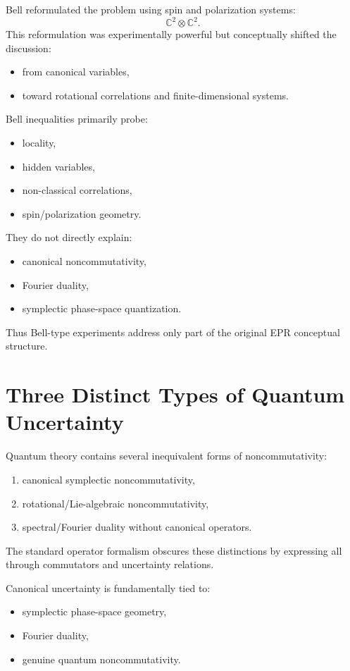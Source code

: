Bell reformulated the problem using spin and polarization systems:
\[
\mathbb C^2\otimes\mathbb C^2.
\]
This reformulation was experimentally powerful but conceptually 
shifted the discussion:
\begin{itemize}
\item from canonical variables,
\item toward rotational correlations and finite-dimensional systems.
\end{itemize}
Bell inequalities primarily probe:
\begin{itemize}
\item locality,
\item hidden variables,
\item non-classical correlations,
\item spin/polarization geometry.
\end{itemize}
They do not directly explain:
\begin{itemize}
\item canonical noncommutativity,
\item Fourier duality,
\item symplectic phase-space quantization.
\end{itemize}
Thus Bell-type experiments address only part of the original 
EPR conceptual structure.

\section{Three Distinct Types of Quantum Uncertainty}

Quantum theory contains several inequivalent forms of noncommutativity:
\begin{enumerate}
\item canonical symplectic noncommutativity,
\item rotational/Lie-algebraic noncommutativity,
\item spectral/Fourier duality without canonical operators.
\end{enumerate}
The standard operator formalism obscures these distinctions by expressing 
all through commutators and uncertainty relations.

Canonical uncertainty is fundamentally tied to:
\begin{itemize}
\item symplectic phase-space geometry,
\item Fourier duality,
\item genuine quantum noncommutativity.
\end{itemize}

